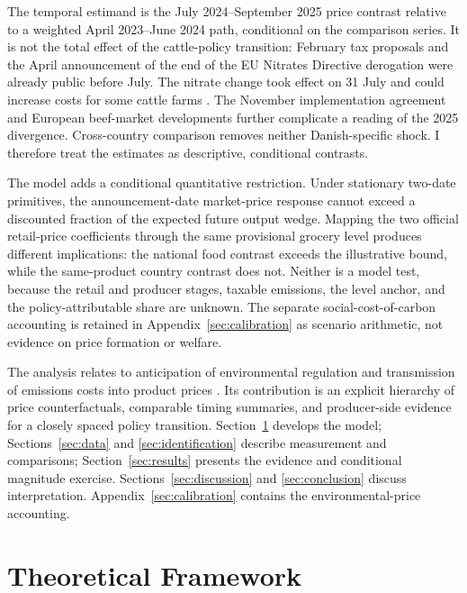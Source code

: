\documentclass[11pt]{article}
\begin{document}
The temporal estimand is the July 2024--September 2025 price contrast relative to a weighted April 2023--June 2024 path, conditional on the comparison series. It is not the total effect of the cattle-policy transition: February tax proposals and the April announcement of the end of the EU Nitrates Directive derogation were already public before July. The nitrate change took effect on 31 July and could increase costs for some cattle farms \citep{danishnitrates2024}. The November implementation agreement and European beef-market developments further complicate a reading of the 2025 divergence. Cross-country comparison removes neither Danish-specific shock. I therefore treat the estimates as descriptive, conditional contrasts.

The model adds a conditional quantitative restriction. Under stationary two-date primitives, the announcement-date market-price response cannot exceed a discounted fraction of the expected future output wedge. Mapping the two official retail-price coefficients through the same provisional grocery level produces different implications: the national food contrast exceeds the illustrative bound, while the same-product country contrast does not. Neither is a model test, because the retail and producer stages, taxable emissions, the level anchor, and the policy-attributable share are unknown. The separate social-cost-of-carbon accounting is retained in Appendix~\ref{sec:calibration} as scenario arithmetic, not evidence on price formation or welfare.

The analysis relates to anticipation of environmental regulation \citep{smulders2012,rittenhouse2018} and transmission of emissions costs into product prices \citep{fabra2014}. Its contribution is an explicit hierarchy of price counterfactuals, comparable timing summaries, and producer-side evidence for a closely spaced policy transition. Section~\ref{sec:theory} develops the model; Sections~\ref{sec:data} and \ref{sec:identification} describe measurement and comparisons; Section~\ref{sec:results} presents the evidence and conditional magnitude exercise. Sections~\ref{sec:discussion} and \ref{sec:conclusion} discuss interpretation. Appendix~\ref{sec:calibration} contains the environmental-price accounting.

\section{Theoretical Framework}\label{sec:theory}
\end{document}
